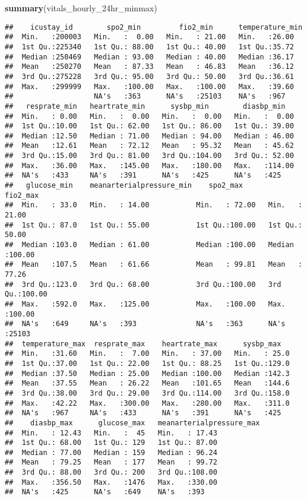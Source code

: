 \documentclass[
]{article}
\newenvironment{Shaded}{\begin{snugshade}}{\end{snugshade}}
\newcommand{\FunctionTok}[1]{\textcolor[rgb]{0.13,0.29,0.53}{\textbf{#1}}}
\newcommand{\NormalTok}[1]{#1}
\begin{document}
\begin{Shaded}
\begin{Highlighting}[]
\FunctionTok{summary}\NormalTok{(vitals\_hourly\_24hr\_minmax)}
\end{Highlighting}
\end{Shaded}

\begin{verbatim}
##    icustay_id        spo2_min         fio2_min      temperature_min
##  Min.   :200003   Min.   :  0.00   Min.   : 21.00   Min.   :26.00  
##  1st Qu.:225340   1st Qu.: 88.00   1st Qu.: 40.00   1st Qu.:35.72  
##  Median :250469   Median : 93.00   Median : 40.00   Median :36.17  
##  Mean   :250270   Mean   : 87.33   Mean   : 46.83   Mean   :36.12  
##  3rd Qu.:275228   3rd Qu.: 95.00   3rd Qu.: 50.00   3rd Qu.:36.61  
##  Max.   :299999   Max.   :100.00   Max.   :100.00   Max.   :39.60  
##                   NA's   :363      NA's   :25103    NA's   :967    
##   resprate_min   heartrate_min      sysbp_min        diasbp_min    
##  Min.   : 0.00   Min.   :  0.00   Min.   :  0.00   Min.   :  0.00  
##  1st Qu.:10.00   1st Qu.: 62.00   1st Qu.: 86.00   1st Qu.: 39.00  
##  Median :12.50   Median : 71.00   Median : 94.00   Median : 46.00  
##  Mean   :12.61   Mean   : 72.12   Mean   : 95.32   Mean   : 45.62  
##  3rd Qu.:15.00   3rd Qu.: 81.00   3rd Qu.:104.00   3rd Qu.: 52.00  
##  Max.   :36.00   Max.   :145.00   Max.   :180.00   Max.   :114.00  
##  NA's   :433     NA's   :391      NA's   :425      NA's   :425     
##   glucose_min    meanarterialpressure_min    spo2_max         fio2_max     
##  Min.   : 33.0   Min.   : 14.00           Min.   : 72.00   Min.   : 21.00  
##  1st Qu.: 87.0   1st Qu.: 55.00           1st Qu.:100.00   1st Qu.: 50.00  
##  Median :103.0   Median : 61.00           Median :100.00   Median :100.00  
##  Mean   :107.5   Mean   : 61.66           Mean   : 99.81   Mean   : 77.26  
##  3rd Qu.:123.0   3rd Qu.: 68.00           3rd Qu.:100.00   3rd Qu.:100.00  
##  Max.   :592.0   Max.   :125.00           Max.   :100.00   Max.   :100.00  
##  NA's   :649     NA's   :393              NA's   :363      NA's   :25103   
##  temperature_max  resprate_max    heartrate_max      sysbp_max    
##  Min.   :31.60   Min.   :  7.00   Min.   : 37.00   Min.   : 25.0  
##  1st Qu.:37.00   1st Qu.: 22.00   1st Qu.: 88.25   1st Qu.:129.0  
##  Median :37.50   Median : 25.00   Median :100.00   Median :142.3  
##  Mean   :37.55   Mean   : 26.22   Mean   :101.65   Mean   :144.6  
##  3rd Qu.:38.00   3rd Qu.: 29.00   3rd Qu.:114.00   3rd Qu.:158.0  
##  Max.   :42.22   Max.   :300.00   Max.   :280.00   Max.   :311.0  
##  NA's   :967     NA's   :433      NA's   :391      NA's   :425    
##    diasbp_max      glucose_max   meanarterialpressure_max
##  Min.   : 12.43   Min.   :  45   Min.   : 17.43          
##  1st Qu.: 68.00   1st Qu.: 129   1st Qu.: 87.00          
##  Median : 77.00   Median : 159   Median : 96.24          
##  Mean   : 79.25   Mean   : 177   Mean   : 99.72          
##  3rd Qu.: 88.00   3rd Qu.: 200   3rd Qu.:108.00          
##  Max.   :356.50   Max.   :1476   Max.   :330.00          
##  NA's   :425      NA's   :649    NA's   :393
\end{verbatim}
\end{document}
